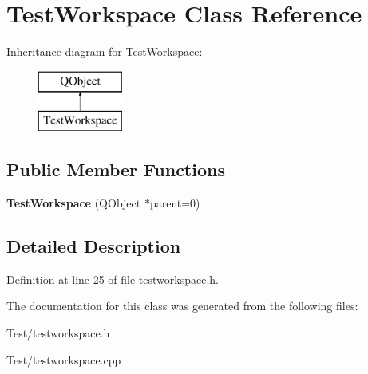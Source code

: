 \hypertarget{class_test_workspace}{}\section{Test\+Workspace Class Reference}
\label{class_test_workspace}
Inheritance diagram for Test\+Workspace\+:\begin{figure}[H]
\begin{center}
\leavevmode
\includegraphics[height=2.000000cm]{class_test_workspace}
\end{center}
\end{figure}
\subsection*{Public Member Functions}
\begin{DoxyCompactItemize}
\item 
{\bfseries Test\+Workspace} (Q\+Object $\ast$parent=0)\hypertarget{class_test_workspace_a0b8d44eb8729534fcb485a4fbc208e74}{}\label{class_test_workspace_a0b8d44eb8729534fcb485a4fbc208e74}

\end{DoxyCompactItemize}


\subsection{Detailed Description}


Definition at line 25 of file testworkspace.\+h.



The documentation for this class was generated from the following files\+:\begin{DoxyCompactItemize}
\item 
Test/testworkspace.\+h\item 
Test/testworkspace.\+cpp\end{DoxyCompactItemize}
